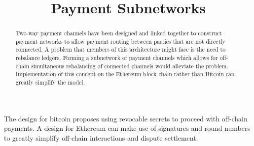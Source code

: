 \documentclass[12pt]{article}
\title{Payment Subnetworks\vspace{-5em}}
\date{}
\author{}
\begin{document}
\maketitle
\begin{abstract}
Two-way payment channels have been designed and linked together to construct payment networks to allow payment routing between parties that are not directly connected. A problem that members of this architecture might face is the need to rebalance ledgers. Forming a subnetwork of payment channels which allows for off-chain simultaneous rebalancing of connected channels would alleviate the problem. Implementation of this concept on the Ethereum block chain rather than Bitcoin can greatly simplify the model.
\end{abstract}

The design for bitcoin proposes using revocable secrets to proceed with off-chain payments. A design for Ethereum can make use of signatures and round numbers to greatly simplify off-chain interactions and dispute settlement.
\end{document}
